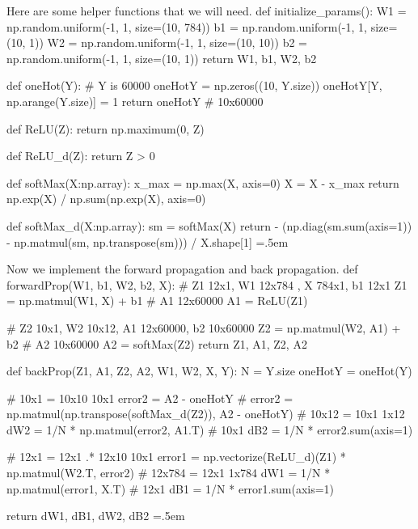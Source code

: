 \documentclass{article}
\newenvironment{cverbatim}
    {\SaveVerbatim{cverb}}
    {\endSaveVerbatim
      \flushleft\fboxrule=0pt\fboxsep=.5em
      \colorbox{cverbbg}{%
        \makebox[\dimexpr\linewidth-2\fboxsep][l]{\BUseVerbatim{cverb}}%
      }
      \endflushleft
  }
\theoremstyle{definition}
\theoremstyle{remark}
\theoremstyle{definition}
\begin{document}
    Here are some helper functions that we will need. 
    \begin{cverbatim}
    def initialize_params(): 
        W1 = np.random.uniform(-1, 1, size=(10, 784)) 
        b1 = np.random.uniform(-1, 1, size=(10, 1)) 
        W2 = np.random.uniform(-1, 1, size=(10, 10)) 
        b2 = np.random.uniform(-1, 1, size=(10, 1)) 
        return W1, b1, W2, b2 

    def oneHot(Y): 
        # Y is 60000 
        oneHotY = np.zeros((10, Y.size))
        oneHotY[Y, np.arange(Y.size)] = 1 
        return oneHotY # 10x60000

    def ReLU(Z): 
        return np.maximum(0, Z)

    def ReLU_d(Z): 
        return Z > 0

    def softMax(X:np.array): 
        x_max = np.max(X, axis=0)
        X = X - x_max
        return np.exp(X) / np.sum(np.exp(X), axis=0) 

    def softMax_d(X:np.array): 
        sm = softMax(X)
        return - (np.diag(sm.sum(axis=1)) - np.matmul(sm, np.transpose(sm))) / X.shape[1]
    \end{cverbatim}

    Now we implement the forward propagation and back propagation. 
    \begin{cverbatim}
    def forwardProp(W1, b1, W2, b2, X): 
        # Z1 12x1, W1 12x784 , X 784x1, b1 12x1
        Z1 = np.matmul(W1, X) + b1
        # A1 12x60000
        A1 = ReLU(Z1) 
        
        # Z2 10x1, W2 10x12, A1 12x60000, b2 10x60000
        Z2 = np.matmul(W2, A1) + b2 
        # A2 10x60000
        A2 = softMax(Z2) 
        return Z1, A1, Z2, A2 

    def backProp(Z1, A1, Z2, A2, W1, W2, X, Y): 
        N = Y.size
        oneHotY = oneHot(Y)
        
        # 10x1 = 10x10 10x1
        error2 = A2 - oneHotY
        # error2 = np.matmul(np.transpose(softMax_d(Z2)), A2 - oneHotY) 
        # 10x12 = 10x1 1x12
        dW2 = 1/N * np.matmul(error2, A1.T)
        # 10x1
        dB2 = 1/N * error2.sum(axis=1)
        
        # 12x1 = 12x1 .* 12x10 10x1
        error1 = np.vectorize(ReLU_d)(Z1) * np.matmul(W2.T, error2) 
        # 12x784 = 12x1 1x784
        dW1 = 1/N * np.matmul(error1, X.T)
        # 12x1 
        dB1 = 1/N * error1.sum(axis=1)

        return dW1, dB1, dW2, dB2 
    \end{cverbatim}
\end{document}
